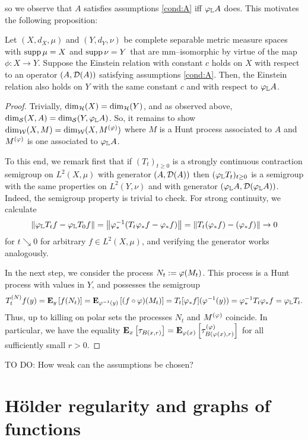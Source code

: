 so we observe that $A$ satisfies assumptions \ref{cond:A} iff $\gp_{\IL} A$ does. This motivates the following proposition:

\begin{prop}\label{prop:mmiso}
  Let $(X,d_X,\mu)$ and $(Y,d_Y,\nu)$ be complete separable metric measure spaces with $\supp\mu=X$ and $\supp\nu=Y$ that are mm--isomorphic by virtue of the map $\phi:X\to Y$. Suppose the Einstein relation with constant $c$ holds on $X$ with respect to an operator $(A,\cD(A))$ satisfying assumptions \ref{cond:A}. Then, the Einstein relation also holds on $Y$ with the same constant $c$ and with respect to $\gp_{\IL} A$.
\end{prop}
\begin{proof}
  Trivially, $\dimh(X)=\dimh(Y)$, and as observed above, $\dims(X,A)=\dims(Y,\gp_{\IL} A)$. So, it remains to show $\dimw(X,M)=\dimw(X,M^{(\gp)})$ where $M$ is a Hunt process associated to $A$ and $M^{(\gp)}$ is one associated to $\gp_{\IL} A$. 
  
  To this end, we remark first that if $(T_t)_{t\geq0}$ is a strongly continuous contraction semigroup on $L^2(X,\mu)$ with generator $(A,\cD(A))$ then 
  $(\gp_{\IL} T_t)_{t\geq0}$ is a semigroup with the same properties on $L^2(Y,\nu)$ and with generator $(\gp_{\IL} A,\cD(\gp_{\IL} A))$. Indeed, the semigroup property is trivial to check. For strong continuity, we calculate
  \[
    \left\|\gp_{\IL} T_t f-\gp_{\IL} T_0 f\right\|
    =\left\|\gp_*^{-1}(T_t\gp_*f-\gp_*f)\right\|
    =\left\|T_t(\gp_*f)-(\gp_*f)\right\| \to 0
  \]
  for $t\searrow 0$ for arbitrary $f\in L^2(X,\mu)$, and verifying the generator works analogously. 
  
  In the next step, we consider the process $N_t:=\gp(M_t)$. This process is a Hunt process with values in $Y$, and possesses the semigroup
  \[
    T_t^{(N)}f(y)
    =\PTEp{f(N_t)}{y}
    =\PTEp{(f\circ\gp)(M_t)}{\gp^{-1}(y)}
    =T_t[\gp_*f](\gp^{-1}(y))
    =\gp_*^{-1}T_t\gp_* f
    =\gp_{\IL} T_t.
  \]
  Thus, up to killing on polar sets the processes $N_t$ and $M^{(\gp)}$ coincide. In particular, we have the equality $\PTEp{\tau_{B(x,r)}}{x}=\PTEp{\tau_{B(\gp(x),r)}^{(\gp)}}{\gp(x)}$ for all 
  sufficiently small $r>0$.
\end{proof}
TO DO: How weak can the assumptions be chosen? 



\newpage

\section{H\"older regularity and graphs of functions}

